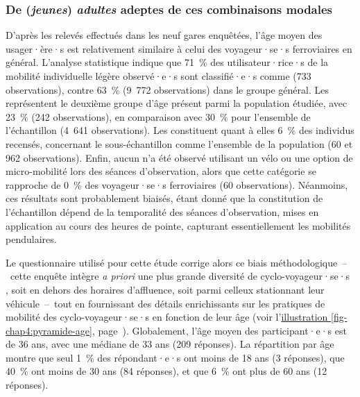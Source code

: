 \begin{refsegment}
\subsubsection*{De (\textsl{jeunes}) \textsl{adultes} adeptes de ces combinaisons modales
    \label{chap4:demographie-age}
    }

D'après les relevés effectués dans les neuf gares enquêtées, l'âge moyen des usager·ère·s est relativement similaire à celui des voyageur·se·s ferroviaires en général. L'analyse statistique indique que 71~\% des utilisateur·rice·s de la mobilité individuelle légère observé·e·s sont classifié·e·s comme  (733 observations), contre 63~\% (9~772 observations) dans le groupe général. Les  représentent le deuxième groupe d'âge présent parmi la population étudiée, avec 23~\% (242 observations), en comparaison avec 30~\% pour l'ensemble de l'échantillon (4~641 observations). Les  constituent quant à elles 6~\% des individus recensés, concernant le sous-échantillon comme l'ensemble de la population (60 et 962 observations). Enfin, aucun  n'a été observé utilisant un vélo ou une option de micro-mobilité lors des séances d'observation, alors que cette catégorie se rapproche de 0~\% des voyageur·se·s ferroviaires (60 observations). Néanmoins, ces résultats sont probablement biaisés, étant donné que la constitution de l'échantillon dépend de la temporalité des séances d'observation, mises en application au cours des heures de pointe, capturant essentiellement les mobilités pendulaires.%

Le questionnaire utilisé pour cette étude corrige alors ce biais méthodologique~–~cette enquête intègre \textsl{a priori} une plus grande diversité de cyclo-voyageur·se·s , soit en dehors des horaires d'affluence, soit parmi celleux stationnant leur véhicule~–~tout en fournissant des détails enrichissants sur les pratiques de mobilité des cyclo-voyageur·se·s en fonction de leur âge (voir l'\hyperref[fig-chap4:pyramide-age]{illustration \ref{fig-chap4:pyramide-age}}, page~\pageref{fig-chap4:pyramide-age}). Globalement, l'âge moyen des participant·e·s est de 36 ans, avec une médiane de 33 ans (209 réponses). La répartition par âge montre que seul 1~\% des répondant·e·s ont moins de 18 ans (3 réponses), que 40~\% ont moins de 30 ans (84 réponses), et que 6~\% ont plus de 60 ans (12 réponses).%


\end{refsegment}

